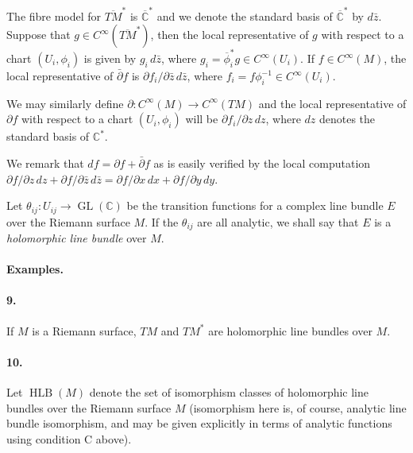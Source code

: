 The fibre model for $\overline{TM}^*$ is $\overline{\mathbb C}^*$ and we denote the standard basis of $\overline{\mathbb C}^*$ by $d\bar z$. Suppose that $g\in C^\infty(\overline{TM}^*)$, then the local representative of $g$ with respect to a chart $(U_i,\phi_i)$ is given by $g_i\,d\bar z$, where $g_i=\overline\phi_i^*g\in C^\infty(U_i)$. If $f\in C^\infty(M)$, the local representative of $\bar\partial f$ is $\partial f_i/\partial\bar z\,d\bar z$, where $f_i=f\phi_i^{-1}\in C^\infty(U_i)$.

We may similarly define $\partial:C^\infty(M)\to C^\infty(TM)$ and the local representative of $\partial f$ with respect to a chart $(U_i,\phi_i)$ will be $\partial f_i/\partial z\,dz$, where $dz$ denotes the standard basis of $\mathbb C^*$.

We remark that $df=\partial f+\bar\partial f$ as is easily verified by the local computation $\partial f/\partial z\,dz+\partial f/\partial\bar z\,d\bar z=\partial f/\partial x\,dx+\partial f/\partial y\,dy$.

 Let $\theta_{ij}:U_{ij}\to\operatorname{GL}(\mathbb C)$ be the transition functions for a complex line bundle $E$ over the Riemann surface $M$. If the $\theta_{ij}$ are all analytic, we shall say that $E$ is a \emph{holomorphic line bundle} over $M$.

\paragraph*{Examples.}
\paragraph*{9.} If $M$ is a Riemann surface, $TM$ and $TM^*$ are holomorphic line bundles over $M$.

\paragraph*{10.} Let $\operatorname{HLB}(M)$ denote the set of isomorphism classes of holomorphic line bundles over the Riemann surface $M$ (isomorphism here is, of course, analytic line bundle isomorphism, and may be given explicitly in terms of analytic functions using condition C above).

